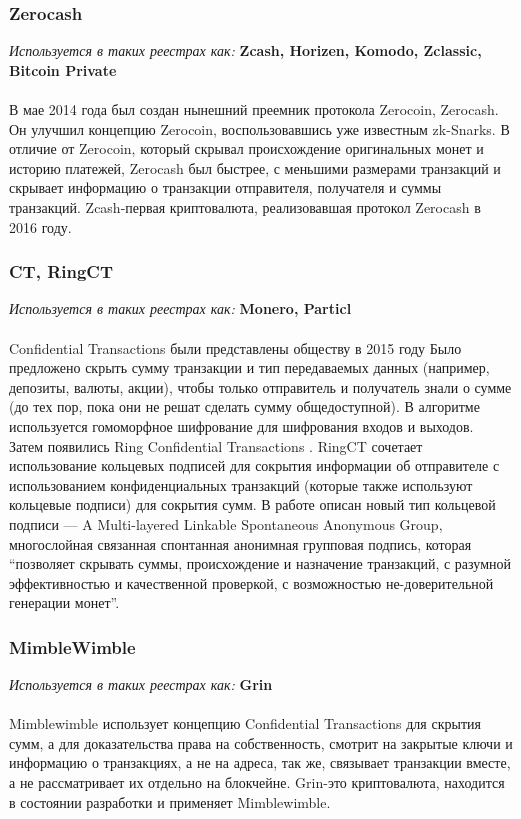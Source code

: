 \subsubsection{Zerocash}
\emph{Используется в таких реестрах как: } \textbf{ Zcash, Horizen, Komodo, Zclassic, Bitcoin Private } \\\\
В мае 2014 года был создан нынешний преемник протокола Zerocoin, Zerocash. Он
улучшил концепцию Zerocoin, воспользовавшись уже известным zk-Snarks. В отличие
от Zerocoin, который скрывал происхождение оригинальных монет и историю
платежей, Zerocash был быстрее, с меньшими размерами транзакций и скрывает
информацию о транзакции отправителя, получателя и суммы транзакций.
Zcash-первая криптовалюта, реализовавшая протокол Zerocash в 2016 году.
\cite{ZerocoinElectricCoinCompany2016}

\subsubsection{CT, RingCT}\label{ringct}
\emph{Используется в таких реестрах как: } \textbf{Monero, Particl} \\\\
Confidential Transactions были представлены обществу в 2015 году \cite{Maxwell}
Было предложено скрыть сумму транзакции и тип передаваемых данных (например,
депозиты, валюты, акции), чтобы только отправитель и получатель знали о сумме
(до тех пор, пока они не решат сделать сумму общедоступной). В алгоритме
используется гомоморфное шифрование для шифрования входов и выходов.\\

Затем появились Ring Confidential Transactions \cite{Noether2016}.  RingCT
сочетает использование кольцевых подписей для сокрытия информации об
отправителе с использованием конфиденциальных транзакций (которые также
используют кольцевые подписи) для сокрытия сумм. В работе описан новый тип
кольцевой подписи --- A Multi-layered Linkable Spontaneous Anonymous Group,
многослойная связанная спонтанная анонимная групповая подпись, которая
``позволяет скрывать суммы, происхождение и назначение транзакций, с разумной
эффективностью и качественной проверкой, с возможностью не-доверительной
генерации монет''.

\subsubsection{MimbleWimble}
\emph{Используется в таких реестрах как: } \textbf{Grin} \\\\
Mimblewimble \cite{Poelstra2016} использует концепцию Confidential Transactions
для скрытия сумм, а для доказательства права на собственность, смотрит на
закрытые ключи и информацию о транзакциях, а не на адреса, так же, связывает
транзакции вместе, а не рассматривает их отдельно на блокчейне. Grin-это
криптовалюта, находится в состоянии разработки и применяет Mimblewimble.

